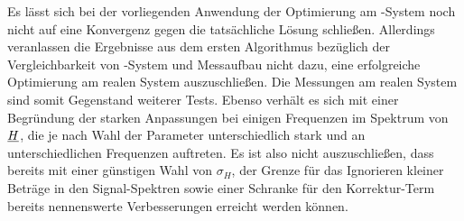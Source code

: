 \documentclass[../Report.tex]{subfiles}
\begin{document}
Es lässt sich bei der vorliegenden Anwendung der Optimierung am \mock-System noch nicht auf eine Konvergenz gegen die tatsächliche Lösung schließen. Allerdings veranlassen die Ergebnisse aus dem ersten Algorithmus bezüglich der Vergleichbarkeit von \mock-System und Messaufbau nicht dazu, eine erfolgreiche Optimierung am realen System auszuschließen.
Die Messungen am realen System sind somit Gegenstand weiterer Tests. Ebenso verhält es sich mit einer Begründung der starken Anpassungen bei einigen Frequenzen im Spektrum von $\underline{H}$, die je nach Wahl der Parameter unterschiedlich stark und an unterschiedlichen Frequenzen auftreten. Es ist also nicht auszuschließen, dass bereits mit einer günstigen Wahl von $\sigma_H$, der Grenze für das Ignorieren kleiner Beträge in den Signal-Spektren sowie einer Schranke für den Korrektur-Term bereits nennenswerte Verbesserungen erreicht werden können.
\end{document}
